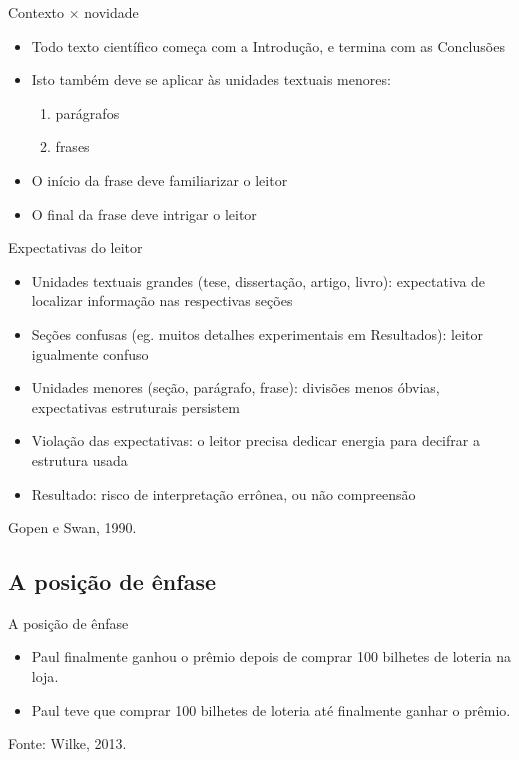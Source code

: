 \documentclass{beamer}
\begin{document}
\begin{frame}{Contexto $\times$ novidade}
  \begin{itemize}
  \item Todo texto científico começa com a Introdução, e termina com
    as Conclusões
  \item Isto também deve se aplicar às unidades textuais menores:
    \begin{enumerate}
    \item<2-> parágrafos
    \item<2-> frases
    \end{enumerate}
  \item O início da frase deve familiarizar o leitor
  \item O final da frase deve intrigar o leitor
  \end{itemize}
\end{frame}

\begin{frame}{Expectativas do leitor}
  \begin{itemize}
  \item Unidades textuais grandes (tese, dissertação, artigo, livro):
    \alert<-2>{expectativa} de localizar informação nas respectivas
    seções
  \item Seções confusas (eg. muitos detalhes experimentais em
    Resultados): leitor igualmente confuso
  \item Unidades menores (seção, parágrafo, frase): divisões menos
    óbvias, \alert<3>{expectativas estruturais persistem}
  \item Violação das expectativas: o \alert{leitor precisa dedicar
      energia} para decifrar a estrutura usada
  \item Resultado: risco de interpretação errônea, ou não compreensão
  \end{itemize}

\vfill
Gopen e Swan, 1990.
\end{frame}

\subsection{A posição de ênfase}

\begin{frame}{A posição de ênfase}
  \begin{example}
    \begin{itemize}
    \item Paul finalmente ganhou o prêmio depois de comprar 100
      bilhetes de loteria \alert<3->{na loja}.
    \item<4> Paul teve que comprar 100 bilhetes de loteria até finalmente
      \alert<5->{ganhar o prêmio}.
    \end{itemize}
  \end{example}

  \vfill
  Fonte: Wilke, 2013.
\end{frame}
\end{document}

